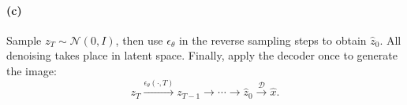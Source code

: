 \documentclass[11pt,a4paper]{article}
\newcommand{\N}{\mathcal{N}}
\begin{document}
\paragraph{(c)}
Sample \(z_T\sim\N(0,I)\), then use \(\epsilon_\theta\) in the reverse
sampling steps to obtain \(\hat z_0\). All denoising takes place in latent
space. Finally, apply the decoder once to generate the image:
\[
z_T
\xrightarrow{\epsilon_\theta(\cdot,T)}
z_{T-1}
\longrightarrow\cdots\longrightarrow
\hat z_0
\xrightarrow{\mathcal D}
\hat x.
\]
\end{document}
